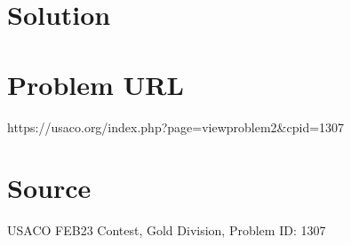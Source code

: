 \documentclass[12pt]{article}
\begin{document}
\section*{Solution}


\section*{Problem URL}
https://usaco.org/index.php?page=viewproblem2&cpid=1307

\section*{Source}
USACO FEB23 Contest, Gold Division, Problem ID: 1307
\end{document}
